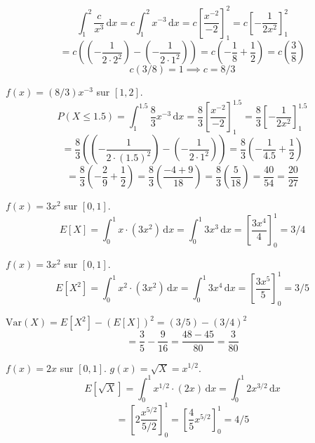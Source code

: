 \begin{correctionbox}
$$\int_1^2 \frac{c}{x^3} \, \mathrm{d}x = c \int_1^2 x^{-3} \, \mathrm{d}x = c \left[ \frac{x^{-2}}{-2} \right]_1^2 = c \left[ -\frac{1}{2x^2} \right]_1^2$$
$$= c \left( (-\frac{1}{2 \cdot 2^2}) - (-\frac{1}{2 \cdot 1^2}) \right) = c \left( -\frac{1}{8} + \frac{1}{2} \right) = c \left( \frac{3}{8} \right)$$
$$c(3/8) = 1 \implies c = 8/3$$
\end{correctionbox}

\begin{correctionbox}
$f(x) = (8/3)x^{-3}$ sur $[1, 2]$.
$$P(X \le 1.5) = \int_1^{1.5} \frac{8}{3}x^{-3} \, \mathrm{d}x = \frac{8}{3} \left[ \frac{x^{-2}}{-2} \right]_1^{1.5} = \frac{8}{3} \left[ -\frac{1}{2x^2} \right]_1^{1.5}$$
$$= \frac{8}{3} \left( (-\frac{1}{2 \cdot (1.5)^2}) - (-\frac{1}{2 \cdot 1^2}) \right) = \frac{8}{3} \left( -\frac{1}{4.5} + \frac{1}{2} \right)$$
$$= \frac{8}{3} \left( -\frac{2}{9} + \frac{1}{2} \right) = \frac{8}{3} \left( \frac{-4+9}{18} \right) = \frac{8}{3} \left( \frac{5}{18} \right) = \frac{40}{54} = \frac{20}{27}$$
\end{correctionbox}

\begin{correctionbox}
$f(x) = 3x^2$ sur $[0, 1]$.
$$E[X] = \int_0^1 x \cdot (3x^2) \, \mathrm{d}x = \int_0^1 3x^3 \, \mathrm{d}x = \left[ \frac{3x^4}{4} \right]_0^1 = 3/4$$
\end{correctionbox}

\begin{correctionbox}
$f(x) = 3x^2$ sur $[0, 1]$.
$$E[X^2] = \int_0^1 x^2 \cdot (3x^2) \, \mathrm{d}x = \int_0^1 3x^4 \, \mathrm{d}x = \left[ \frac{3x^5}{5} \right]_0^1 = 3/5$$
\end{correctionbox}

\begin{correctionbox}
$\text{Var}(X) = E[X^2] - (E[X])^2 = (3/5) - (3/4)^2$
$$= \frac{3}{5} - \frac{9}{16} = \frac{48 - 45}{80} = \frac{3}{80}$$
\end{correctionbox}

\begin{correctionbox}
$f(x) = 2x$ sur $[0, 1]$. $g(x) = \sqrt{X} = x^{1/2}$.
$$E[\sqrt{X}] = \int_0^1 x^{1/2} \cdot (2x) \, \mathrm{d}x = \int_0^1 2x^{3/2} \, \mathrm{d}x$$
$$= \left[ 2 \frac{x^{5/2}}{5/2} \right]_0^1 = \left[ \frac{4}{5} x^{5/2} \right]_0^1 = 4/5$$
\end{correctionbox}


